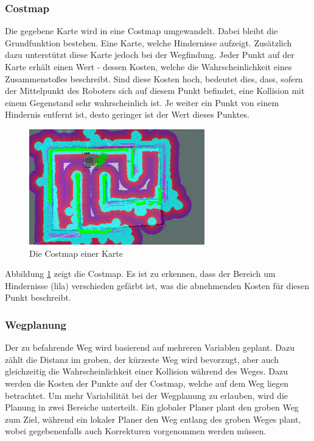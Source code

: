 {{{{			\subsubsection{Costmap}
			{
				Die gegebene Karte wird in eine Costmap umgewandelt. Dabei bleibt die Grundfunktion bestehen. Eine Karte, welche Hindernisse aufzeigt. Zusätzlich dazu unterstützt diese Karte jedoch bei der Wegfindung. Jeder Punkt auf der Karte erhält einen Wert - dessen Kosten, welche die Wahrscheinlichkeit eines Zusammenstoßes beschreibt. Sind diese Kosten hoch, bedeutet dies, dass, sofern der Mittelpunkt des Roboters sich auf diesem Punkt befindet, eine Kollision mit einem Gegenstand sehr wahrscheinlich ist. Je weiter ein Punkt von einem Hindernis entfernt ist, desto geringer ist der Wert dieses Punktes. 
				\begin{figure}[H]
					\centering				\includegraphics[height=5cm]{Bilder/costmap_overlayed.png}
					\caption{Die Costmap einer Karte} 
					\label{pic:costmapoverlayed}
				\end{figure}
				Abbildung \ref{pic:costmapoverlayed} zeigt die Costmap. Es ist zu erkennen, dass der Bereich um Hindernisse (lila) verschieden gefärbt ist, was die abnehmenden Kosten für diesen Punkt beschreibt. \parencite{roboknowcost}
			}
			
			\subsubsection{Wegplanung}
			{
				Der zu befahrende Weg wird basierend auf mehreren Variablen geplant. Dazu zählt die Distanz im groben, \dahe der kürzeste Weg wird bevorzugt, aber auch gleichzeitig die Wahrscheinlichkeit einer Kollision während des Weges. Dazu werden die Kosten der Punkte auf der Costmap, welche auf dem Weg liegen betrachtet. Um mehr Variabilität bei der Wegplanung zu erlauben, wird die Planung in zwei Bereiche unterteilt. Ein globaler Planer plant den groben Weg zum Ziel, während ein lokaler Planer den Weg entlang des groben Weges plant, wobei gegebenenfalls auch Korrekturen vorgenommen werden müssen.
				
}}}}}
